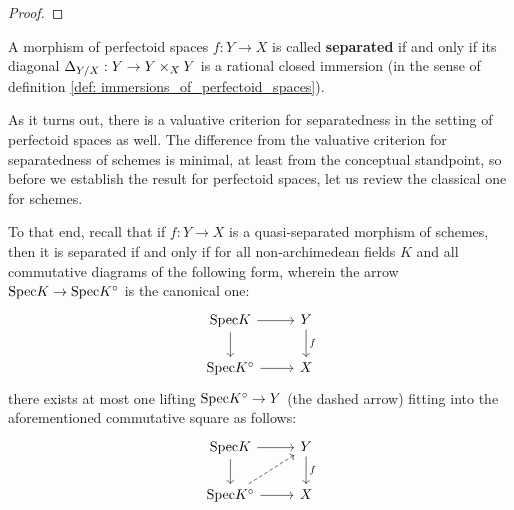                 \begin{proof}
                    
                \end{proof}
            \begin{definition} \label{def: separated_perfectoid_spaces}
                A morphism of perfectoid spaces $f: Y \to X$ is called \textbf{separated} if and only if its diagonal $\Delta_{Y/X}: Y \to Y \x_X Y$ is a rational closed immersion (in the sense of definition \ref{def: immersions_of_perfectoid_spaces}).
            \end{definition}
            \begin{remark}
                As it turns out, there is a valuative criterion for separatedness in the setting of perfectoid spaces as well. The difference from the valuative criterion for separatedness of schemes is minimal, at least from the conceptual standpoint, so before we establish the result for perfectoid spaces, let us review the classical one for schemes.
                
                To that end, recall that if $f: Y \to X$ is a quasi-separated morphism of schemes, then it is separated if and only if for all non-archimedean fields $K$ and all commutative diagrams of the following form, wherein the arrow $\mathrm{Spec} K \to \mathrm{Spec} K^{\circ}$ is the canonical one:
                    $$
                        \begin{tikzcd}
                        	{\Spec K} & Y \\
                        	{\Spec K^{\circ}} & X
                        	\arrow["f", from=1-2, to=2-2]
                        	\arrow[from=1-1, to=2-1]
                        	\arrow[from=2-1, to=2-2]
                        	\arrow[from=1-1, to=1-2]
                        \end{tikzcd}
                    $$
                there exists at most one lifting $\mathrm{Spec} K^{\circ} \to Y$ (the dashed arrow) fitting into the aforementioned commutative square as follows:
                    $$
                        \begin{tikzcd}
                        	{\Spec K} & Y \\
                        	{\Spec K^{\circ}} & X
                        	\arrow["f", from=1-2, to=2-2]
                        	\arrow[from=1-1, to=2-1]
                        	\arrow[from=2-1, to=2-2]
                        	\arrow[from=1-1, to=1-2]
                        	\arrow[dashed, from=2-1, to=1-2]
                        \end{tikzcd}
                    $$
            \end{remark}
